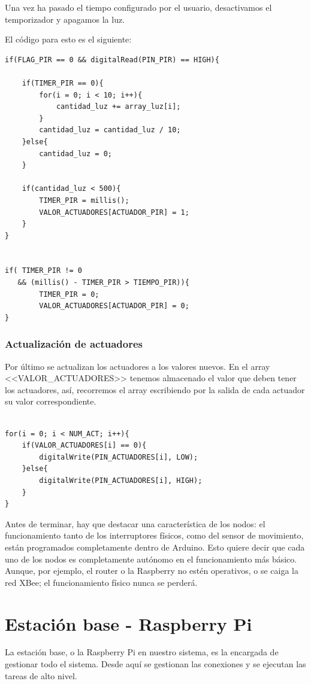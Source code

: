 Una vez ha pasado el tiempo configurado por el usuario, desactivamos el temporizador y apagamos la luz.

El código para esto es el siguiente:

\begin{lstlisting}
if(FLAG_PIR == 0 && digitalRead(PIN_PIR) == HIGH){

    if(TIMER_PIR == 0){
        for(i = 0; i < 10; i++){
            cantidad_luz += array_luz[i];
        }
        cantidad_luz = cantidad_luz / 10;
    }else{
        cantidad_luz = 0;
    }

    if(cantidad_luz < 500){
        TIMER_PIR = millis();
        VALOR_ACTUADORES[ACTUADOR_PIR] = 1;
    }
}


if( TIMER_PIR != 0 
   && (millis() - TIMER_PIR > TIEMPO_PIR)){
        TIMER_PIR = 0;
        VALOR_ACTUADORES[ACTUADOR_PIR] = 0;
}
\end{lstlisting}


\subsubsection{Actualización de actuadores}
Por último se actualizan los actuadores a los valores nuevos. En el array <<VALOR\_ACTUADORES>> tenemos almacenado el valor que deben tener los actuadores, así, recorremos el array escribiendo por la salida de cada actuador su valor correspondiente. 




\begin{lstlisting}

for(i = 0; i < NUM_ACT; i++){
    if(VALOR_ACTUADORES[i] == 0){
        digitalWrite(PIN_ACTUADORES[i], LOW);
    }else{
        digitalWrite(PIN_ACTUADORES[i], HIGH);
    }
}

\end{lstlisting}

Antes de terminar, hay que destacar una característica de los nodos: el funcionamiento tanto de los interruptores físicos, como del sensor de movimiento, están programados completamente dentro de Arduino. Esto quiere decir que cada uno de los nodos es completamente autónomo en el funcionamiento más básico. Aunque, por ejemplo, el router o la Raspberry no estén operativos, o se caiga la red XBee; el funcionamiento físico nunca se perderá.

\section{Estación base - Raspberry Pi}
La estación base, o la Raspberry Pi en nuestro sistema, es la encargada de gestionar todo el sistema. Desde aquí se gestionan las conexiones y se ejecutan las tareas de alto nivel.


